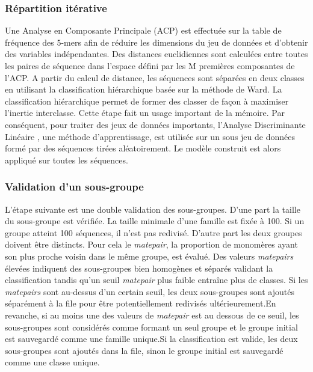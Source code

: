 \documentclass[12pt,a4paper]{article}
\begin{document}
	\subsubsection{Répartition itérative}
Une Analyse en Composante Principale (ACP) est effectuée sur la table de fréquence des 5-mers afin de réduire les dimensions du jeu de données et d’obtenir des variables indépendantes. Des distances euclidiennes sont calculées entre toutes les paires de séquence dans l’espace défini par les M premières composantes de l’ACP. A partir du calcul de distance, les séquences sont séparées en deux classes en utilisant la classification hiérarchique basée sur la méthode de Ward. La classification hiérarchique permet de former des classer de façon à maximiser l’inertie interclasse. Cette étape fait un usage important de la mémoire. Par conséquent, pour traiter des jeux de données importants, l’Analyse Discriminante Linéaire , une méthode d’apprentissage, est utilisée sur un sous jeu de données formé par des séquences tirées aléatoirement. Le modèle construit est alors appliqué sur toutes les séquences.
	\subsubsection{Validation d'un sous-groupe}
L'étape suivante est une double validation des sous-groupes. D'une part la taille du sous-groupe est vérifiée. La taille minimale d'une famille est fixée à 100. Si un groupe atteint 100 séquences, il n'est pas redivisé. D'autre part les deux groupes doivent être distincts. Pour cela le \textit{matepair}, la proportion de monomères ayant son plus proche voisin dans le même groupe, est évalué. Des valeurs \textit{matepairs} élevées indiquent des sous-groupes bien homogènes et séparés validant la classification tandis qu’un seuil \textit{matepair} plus faible entraîne plus de classes. Si les \textit{matepairs} sont au-dessus d’un certain seuil, les deux sous-groupes sont ajoutés séparément à la file pour être potentiellement redivisés ultérieurement.En revanche, si au moins une des valeurs de \textit{matepair} est au dessous de ce seuil, les sous-groupes sont considérés comme formant un seul groupe et le groupe initial est sauvegardé comme une famille unique.Si la classification est valide, les deux sous-groupes sont ajoutés dans la file, sinon le groupe initial est sauvegardé comme une classe unique. 
 
\end{document}
